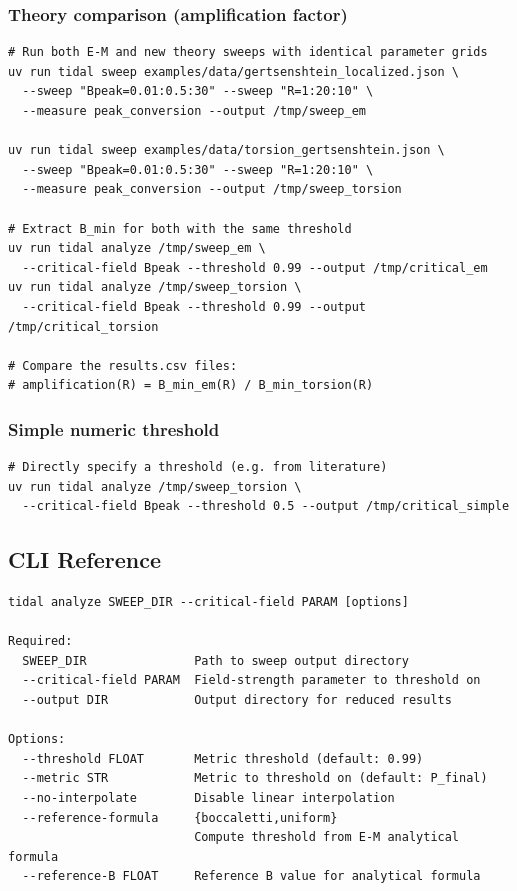 \subsubsection{Theory comparison (amplification factor)}
\label{sec:theory-comparison}

\begin{lstlisting}[style=bash]
# Run both E-M and new theory sweeps with identical parameter grids
uv run tidal sweep examples/data/gertsenshtein_localized.json \
  --sweep "Bpeak=0.01:0.5:30" --sweep "R=1:20:10" \
  --measure peak_conversion --output /tmp/sweep_em

uv run tidal sweep examples/data/torsion_gertsenshtein.json \
  --sweep "Bpeak=0.01:0.5:30" --sweep "R=1:20:10" \
  --measure peak_conversion --output /tmp/sweep_torsion

# Extract B_min for both with the same threshold
uv run tidal analyze /tmp/sweep_em \
  --critical-field Bpeak --threshold 0.99 --output /tmp/critical_em
uv run tidal analyze /tmp/sweep_torsion \
  --critical-field Bpeak --threshold 0.99 --output /tmp/critical_torsion

# Compare the results.csv files:
# amplification(R) = B_min_em(R) / B_min_torsion(R)
\end{lstlisting}

\subsubsection{Simple numeric threshold}
\label{sec:simple-threshold}

\begin{lstlisting}[style=bash]
# Directly specify a threshold (e.g. from literature)
uv run tidal analyze /tmp/sweep_torsion \
  --critical-field Bpeak --threshold 0.5 --output /tmp/critical_simple
\end{lstlisting}

\subsection{CLI Reference}
\label{sec:cf-cli}

\begin{lstlisting}
tidal analyze SWEEP_DIR --critical-field PARAM [options]

Required:
  SWEEP_DIR               Path to sweep output directory
  --critical-field PARAM  Field-strength parameter to threshold on
  --output DIR            Output directory for reduced results

Options:
  --threshold FLOAT       Metric threshold (default: 0.99)
  --metric STR            Metric to threshold on (default: P_final)
  --no-interpolate        Disable linear interpolation
  --reference-formula     {boccaletti,uniform}
                          Compute threshold from E-M analytical formula
  --reference-B FLOAT     Reference B value for analytical formula
\end{lstlisting}

